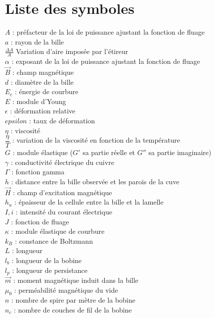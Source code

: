 \chapter*{Liste des symboles}

$A$ : préfacteur de la loi de puissance ajustant la fonction de fluage\\
$a$ : rayon de la bille\\
$\frac{\Delta A}{A}$ Variation d'aire imposée par l'étireur\\
$\alpha$ : exposant de la loi de puissance ajustant la fonction de fluage\\
$\vec{B}$ : champ magnétique\\
$d$ : diamètre de la bille\\
$E_c$ : énergie de courbure\\
$E$ : module d'Young\\
$\epsilon$ : déformation relative\\
$\dot{epsilon}$ : taux de déformation \\
$\eta$ : viscosité\\
$\dfrac{\eta}{T}$ : variation de la viscosité en fonction de la température\\
$G$ : module élastique ($G'$ sa partie réelle et $G''$ sa partie imaginaire)\\
$\gamma$ : conductivité électrique du cuivre\\
$\Gamma$ : fonction gamma \\
$h$ : distance entre la bille observée et les parois de la cuve\\
$\vec{H} $ : champ d'excitation magnétique \\
$h_u$ : épaisseur de la cellule entre la bille et la lamelle\\
$I,i$ : intensité du courant électrique\\
$J$ : fonction de fluage\\
$\kappa$ : module élastique de courbure\\
$k_B$ : constance de Boltzmann\\
$L$ : longueur\\
$l_b$ : longueur de la bobine\\
$l_p$ : longueur de persistance\\
$\vec{m}$ : moment magnétique induit dans la bille\\
$\mu_0$ : perméabilité magnétique du vide\\
$n$ : nombre de spire par mètre de la bobine\\
$n_c$ : nombre de couches de fil de la bobine\\
